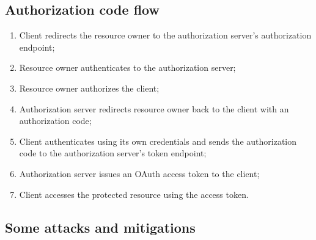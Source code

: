 \documentclass[a4paper, 10pt, titlepage]{article}
\begin{document}
\subsection{Authorization code flow} 
\begin{enumerate}
\item Client redirects the resource owner to the authorization server's authorization endpoint;
\item Resource owner authenticates to the authorization server;
\item Resource owner authorizes the client;
\item Authorization server redirects resource owner back to the client with an authorization code;
\item Client authenticates using its own credentials and sends the authorization code to the authorization server’s token endpoint;
\item Authorization server issues an OAuth access token to the client;
\item Client accesses the protected resource using the access token.
\end{enumerate}

\subsection{Some attacks and mitigations}
\end{document}
